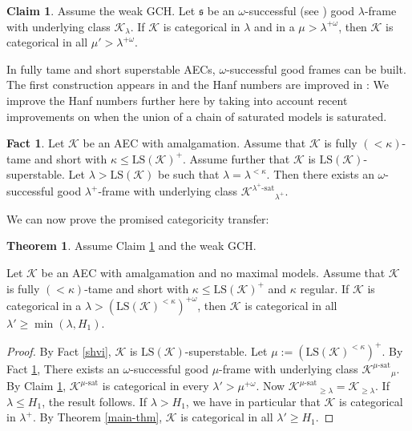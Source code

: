 \documentclass[12pt]{amsart}
\theoremstyle{definition}
\newtheorem{thm}[mydef]{Theorem}
\newtheorem{claim}[mydef]{Claim}
\newtheorem{fact}[mydef]{Fact}
\begin{document}
\begin{claim}\label{claim-xxx}
  Assume the weak GCH. Let ${\mathfrak{s}}$ be an $\omega$-successful (see \cite[Definition III.1.12]{shelahaecbook}) good $\lambda$-frame with underlying class ${\mathcal{K}}_\lambda$. If ${\mathcal{K}}$ is categorical in $\lambda$ and in a $\mu > \lambda^{+\omega}$, then ${\mathcal{K}}$ is categorical in all $\mu' > \lambda^{+\omega}$.
\end{claim}

In fully tame and short superstable AECs, $\omega$-successful good frames can be built. The first construction appears in \cite[Section 11]{indep-aec-v5} and the Hanf numbers are improved in \cite[Lemma A.14]{ap-universal-v8}: We improve the Hanf numbers further here by taking into account recent improvements on when the union of a chain of saturated models is saturated.

\begin{fact}\label{omega-successful-constr}
Let ${\mathcal{K}}$ be an AEC with amalgamation. Assume that ${\mathcal{K}}$ is fully $(<\kappa)$-tame and short with $\kappa \le {\text{LS}} ({\mathcal{K}})^+$. Assume further that ${\mathcal{K}}$ is ${\text{LS}} ({\mathcal{K}})$-superstable. Let $\lambda > {\text{LS}} ({\mathcal{K}})$ be such that $\lambda = \lambda^{<\kappa}$. Then there exists an $\omega$-successful good $\lambda^+$-frame with underlying class ${{{{\mathcal{K}}}^{{{\lambda^+}}\text{-sat}}}}_{\lambda^+}$.
\end{fact}

We can now prove the promised categoricity transfer:

\begin{thm}\label{fully-tame-short-categ}
  Assume Claim \ref{claim-xxx} and the weak GCH.
  
  Let ${\mathcal{K}}$ be an AEC with amalgamation and no maximal models. Assume that ${\mathcal{K}}$ is fully $(<\kappa)$-tame and short with $\kappa \le {\text{LS}} ({\mathcal{K}})^+$ and $\kappa$ regular. If ${\mathcal{K}}$ is categorical in a $\lambda > \left({\text{LS}} ({\mathcal{K}})^{<\kappa}\right)^{+\omega}$, then ${\mathcal{K}}$ is categorical in all $\lambda' \ge \min (\lambda, H_1)$.
\end{thm}
\begin{proof}
  By Fact \ref{shvi}, ${\mathcal{K}}$ is ${\text{LS}} ({\mathcal{K}})$-superstable. Let $\mu := ({\text{LS}} ({\mathcal{K}})^{<\kappa})^+$. By Fact \ref{omega-successful-constr}, There exists an $\omega$-successful good $\mu$-frame with underlying class ${{{{\mathcal{K}}}^{{{\mu}}\text{-sat}}}}_{\mu}$. By Claim \ref{claim-xxx}, ${{{{\mathcal{K}}}^{{{\mu}}\text{-sat}}}}$ is categorical in every $\lambda' > \mu^{+\omega}$. Now ${{{{\mathcal{K}}}^{{{\mu}}\text{-sat}}}}_{\ge \lambda} = {\mathcal{K}}_{\ge \lambda}$. If $\lambda \le H_1$, the result follows. If $\lambda > H_1$, we have in particular that ${\mathcal{K}}$ is categorical in $\lambda^+$. By Theorem \ref{main-thm}, ${\mathcal{K}}$ is categorical in all $\lambda' \ge H_1$.
\end{proof}
\end{document}
